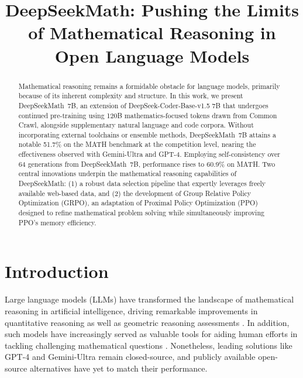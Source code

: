 \title{DeepSeekMath: Pushing the Limits of Mathematical Reasoning in Open Language Models}

\begin{abstract}
Mathematical reasoning remains a formidable obstacle for language models, primarily because of its inherent complexity and structure. In this work, we present DeepSeekMath~7B, an extension of DeepSeek-Coder-Base-v1.5 7B that undergoes continued pre-training using 120B mathematics-focused tokens drawn from Common Crawl, alongside supplementary natural language and code corpora. Without incorporating external toolchains or ensemble methods, DeepSeekMath~7B attains a notable 51.7\% on the MATH benchmark at the competition level, nearing the effectiveness observed with Gemini-Ultra and GPT-4. Employing self-consistency over 64 generations from DeepSeekMath~7B, performance rises to 60.9\% on MATH. Two central innovations underpin the mathematical reasoning capabilities of DeepSeekMath: (1) a robust data selection pipeline that expertly leverages freely available web-based data, and (2) the development of Group Relative Policy Optimization (GRPO), an adaptation of Proximal Policy Optimization (PPO) designed to refine mathematical problem solving while simultaneously improving PPO’s memory efficiency.
\end{abstract}

\section{Introduction}

Large language models (LLMs) have transformed the landscape of mathematical reasoning in artificial intelligence, driving remarkable improvements in quantitative reasoning \citep{MATH} as well as geometric reasoning assessments \citep{trinh2024solving}. In addition, such models have increasingly served as valuable tools for aiding human efforts in tackling challenging mathematical questions \citep{tao}. Nonetheless, leading solutions like GPT-4 \citep{gpt4} and Gemini-Ultra \citep{gemini} remain closed-source, and publicly available open-source alternatives have yet to match their performance.


